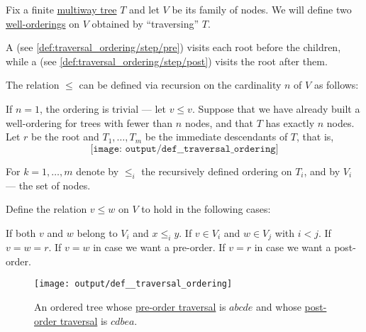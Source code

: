 \begin{definition}\label{def:traversal_ordering}
  Fix a finite \hyperref[def:multiway_tree]{multiway tree} \( T \) and let \( V \) be its family of nodes. We will define two \hyperref[def:well_ordered_set]{well-orderings} on \( V \) obtained by \enquote{traversing} \( T \).

  A  (see \ref{def:traversal_ordering/step/pre}) visits each root before the children, while a  (see \ref{def:traversal_ordering/step/post}) visits the root after them.

  The relation \( \leq \) can be defined via recursion on the cardinality \( n \) of \( V \) as follows:
  \begin{thmenum}
     If \( n = 1 \), the ordering is trivial --- let \( v \leq v \).
     Suppose that we have already built a well-ordering for trees with fewer than \( n \) nodes, and that \( T \) has exactly \( n \) nodes. Let \( r \) be the root and \( T_1, \ldots, T_m \) be the immediate descendants of \( T \), that is,
    \begin{equation*}
      \texttt{[image: output/def\_\_traversal\_ordering]}
    \end{equation*}

    For \( k = 1, \ldots, m \) denote by \( \leq_i \) the recursively defined ordering on \( T_i \), and by \( V_i \) --- the set of nodes.

    Define the relation \( v \leq w \) on \( V \) to hold in the following cases:
    \begin{thmenum}
       If both \( v \) and \( w \) belong to \( V_i \) and \( x \leq_i y \).
       If \( v \in V_i \) and \( w \in V_j \) with \( i < j \).
       If \( v = w = r \).
       If \( v = w \) in case we want a pre-order.
       If \( v = r \) in case we want a post-order.
    \end{thmenum}
  \end{thmenum}

  \begin{figure}[!ht]
    \centering
    \texttt{[image: output/def\_\_traversal\_ordering]}
    \caption{An ordered tree whose \hyperref[def:traversal_ordering]{pre-order traversal} is \( abcde \) and whose \hyperref[def:traversal_ordering]{post-order traversal} is \( cdbea \).}
    \label{fig:def:traversal_ordering}
  \end{figure}
\end{definition}
